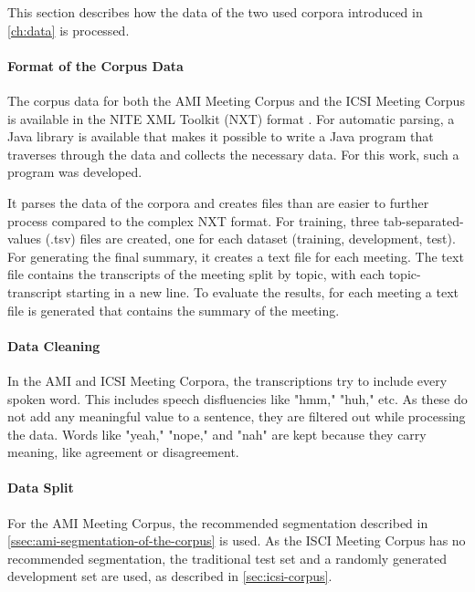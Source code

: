 This section describes how the data of the two used corpora introduced in \cref{ch:data} is processed.

\paragraph{Format of the Corpus Data}

The corpus data for both the AMI Meeting Corpus and the ICSI Meeting Corpus is available in the NITE XML Toolkit (NXT) format \cite{Carletta2003}.
For automatic parsing, a Java library is available that makes it possible to write a Java program that traverses through the data and collects the necessary data.
For this work, such a program was developed.

It parses the data of the corpora and creates files than are easier to further process compared to the complex NXT format.
For training, three tab-separated-values (.tsv) files are created, one for each dataset (training, development, test).
For generating the final summary, it creates a text file for each meeting.
The text file contains the transcripts of the meeting split by topic, with each topic-transcript starting in a new line.
To evaluate the results, for each meeting a text file is generated that contains the summary of the meeting.

\paragraph{Data Cleaning}

In the AMI and ICSI Meeting Corpora, the transcriptions try to include every spoken word.
This includes speech disfluencies like "hmm," "huh," etc.
As these do not add any meaningful value to a sentence, they are filtered out while processing the data.
Words like "yeah," "nope," and "nah" are kept because they carry meaning, like agreement or disagreement. 

\paragraph{Data Split}

For the AMI Meeting Corpus, the recommended segmentation described in \cref{ssec:ami-segmentation-of-the-corpus} is used.
As the ISCI Meeting Corpus has no recommended segmentation, the traditional test set and a randomly generated development set are used, as described in \cref{sec:icsi-corpus}.


